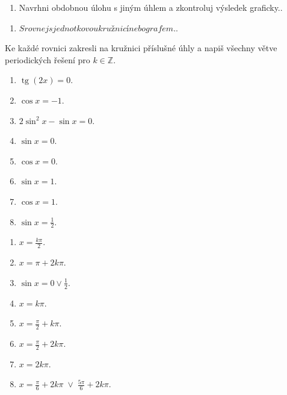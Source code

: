 \documentclass[11pt,a4paper]{article}
\begin{document}
\begin{zadaniReseniBox}[title={Rozšíření 1}]
\begin{enumerate}[label=\alph*)]
\item Navrhni obdobnou úlohu s jiným úhlem a zkontroluj výsledek graficky..
\end{enumerate}
\tcblower
\begin{enumerate}[label=\alph*)]
\item $Srovnej s jednotkovou kružnicí nebo grafem.$.
\end{enumerate}
\end{zadaniReseniBox}
Ke každé rovnici zakresli na kružnici příslušné úhly a napiš všechny větve periodických řešení pro $k\in\mathbb Z$.
\begin{zadaniReseniBox}[title={Domácí úkol}]
\begin{enumerate}[label=\alph*)]
\item $\operatorname{tg}(2x)=0$.
\item $\cos x=-1$.
\item $2\sin^2x-\sin x=0$.
\item $\sin x=0$.
\item $\cos x=0$.
\item $\sin x=1$.
\item $\cos x=1$.
\item $\sin x=\frac{1}{2}$.
\end{enumerate}
\tcblower
\begin{enumerate}[label=\alph*)]
\item $x=\frac{k\pi}{2}$.
\item $x=\pi+2k\pi$.
\item $\sin x=0\lor\frac{1}{2}$.
\item $x=k\pi$.
\item $x=\frac{\pi}{2}+k\pi$.
\item $x=\frac{\pi}{2}+2k\pi$.
\item $x=2k\pi$.
\item $x=\frac{\pi}{6}+2k\pi\;\lor\;\frac{5\pi}{6}+2k\pi$.
\end{enumerate}
\end{zadaniReseniBox}
\end{document}
